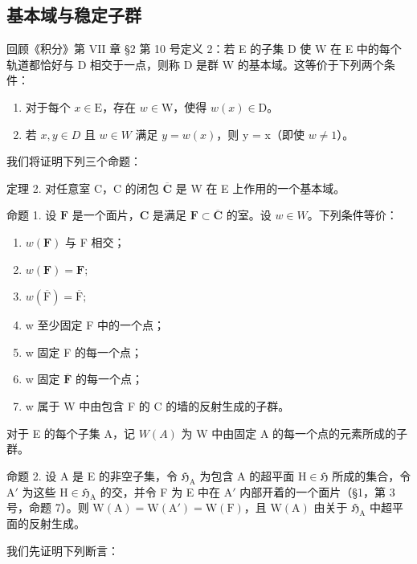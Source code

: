\subsection{基本域与稳定子群}

回顾《积分》第 VII 章 §2 第 10 号定义 2：若 E 的子集 D 使 W 在 E 中的每个轨道都恰好与 D 相交于一点，则称 D 是群 W 的基本域。这等价于下列两个条件：

\begin{enumerate}
\def\labelenumi{\alph{enumi})}
\item
对于每个 \(x \in \mathrm{E}\)，存在 \(w \in \mathrm{W}\)，使得 \(w(x) \in \mathrm{D}\)。
\item
若 \(x, y \in D\) 且 \(w \in W\) 满足 \(y = w(x)\)，则 y = x（即使 \(w \neq 1\)）。
\end{enumerate}

我们将证明下列三个命题：

定理 2. 对任意室 C，C 的闭包 \(\overline{\mathbf{C}}\) 是 W 在 E 上作用的一个基本域。

命题 1. 设 \(\mathbf{F}\) 是一个面片，\(\mathbf{C}\) 是满足 \(\mathbf{F} \subset \overline{\mathbf{C}}\) 的室。设 \(w \in W\)。下列条件等价：

\begin{enumerate}
\def\labelenumi{(\roman{enumi})}
\item
\(w(\mathbf{F})\) 与 F 相交；
\item
\(w(\mathbf{F}) = \mathbf{F};\)
\item
\(w(\overline{\mathrm{F}}) = \overline{\mathrm{F}};\)
\item
w 至少固定 F 中的一个点；
\item
w 固定 F 的每一个点；
\item
w 固定 \(\overline{\mathbf{F}}\) 的每一个点；
\item
w 属于 W 中由包含 F 的 C 的墙的反射生成的子群。
\end{enumerate}

对于 E 的每个子集 A，记 \(W(A)\) 为 W 中由固定 A 的每一个点的元素所成的子群。

命题 2. 设 A 是 E 的非空子集，令 \(\mathfrak{H}_{\mathrm{A}}\) 为包含 A 的超平面 \(\mathrm{H} \in \mathfrak{H}\) 所成的集合，令 \(\mathrm{A}'\) 为这些 \(\mathrm{H} \in \mathfrak{H}_{\mathrm{A}}\) 的交，并令 F 为 E 中在 \(\mathrm{A}'\) 内部开着的一个面片（§1，第 3 号，命题 7）。则 \(\mathrm{W(A)} = \mathrm{W(A')} = \mathrm{W(F)}\)，且 \(\mathrm{W(A)}\) 由关于 \(\mathfrak{H}_{\mathrm{A}}\) 中超平面的反射生成。

我们先证明下列断言：

